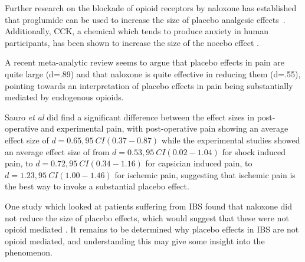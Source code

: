 Further research on the blockade of opioid receptors by naloxone has established that proglumide can be used to increase the size of placebo analgesic effects~\cite{Benedetti1995}. Additionally, CCK, a chemical which tends to produce anxiety in human participants, has been shown to increase the size of the nocebo effect \cite{Benedetti1996}. 

A recent meta-analytic review \cite{Sauro2005} seems to argue that placebo effects in pain are quite large (d=.89) and that naloxone is quite effective in reducing them (d=.55), pointing towards an interpretation of placebo effects in pain being substantially mediated by endogenous opioids. 

Sauro \textit{et al} did find a significant difference between the effect sizes in post-operative and experimental pain, with post-operative pain showing an average effect size of $d=0.65, 95~CI(0.37-0.87)$ while the experimental studies showed an average effect size of from $d=0.53, 95~CI(0.02-1.04)$ for shock induced pain, to $d=0.72, 95~CI(0.34-1.16)$ for capsician induced pain, to $d=1.23, 95~CI(1.00-1.46)$ for ischemic pain, suggesting that ischemic pain is the best way to invoke a substantial placebo effect. %


One study which looked at patients suffering from IBS found that naloxone did not reduce the size of placebo effects, which would suggest that these were not opioid mediated \cite{Vase2005}. It remains to be determined why placebo effects in IBS are not opioid mediated, and understanding this may give some insight into the phenomenon. 

